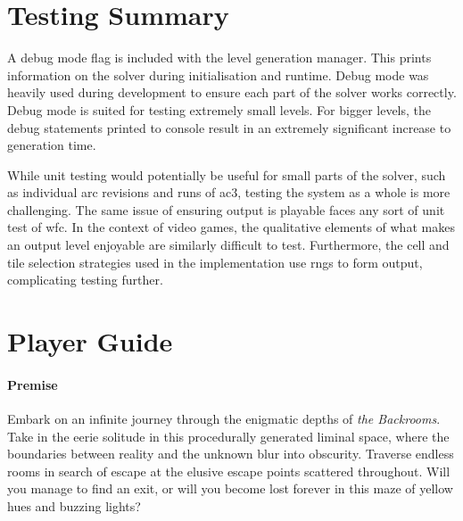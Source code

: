 \appendix
\chapter{Testing Summary}
A debug mode flag is included with the level generation manager. This prints information on the solver during initialisation and runtime. Debug mode was heavily used during development to ensure each part of the solver works correctly. Debug mode is suited for testing extremely small levels. For bigger levels, the debug statements printed to console result in an extremely significant increase to generation time.

While unit testing would potentially be useful for small parts of the solver, such as individual arc revisions and runs of \acrshort{ac3}, testing the system as a whole is more challenging. The same issue of ensuring output is playable faces any sort of unit test of \acrshort{wfc}. In the context of video games, the qualitative elements of what makes an output level enjoyable are similarly difficult to test. Furthermore, the cell and tile selection strategies used in the implementation use \acrshort{rng}s to form output, complicating testing further.

\chapter{Player Guide}
\subsubsection{Premise}

Embark on an infinite journey through the enigmatic depths of \textit{the Backrooms}. Take in the eerie solitude in this procedurally generated liminal space, where the boundaries between reality and the unknown blur into obscurity. Traverse endless rooms in search of escape at the elusive escape points scattered throughout. Will you manage to find an exit, or will you become lost forever in this maze of yellow hues and buzzing lights?

